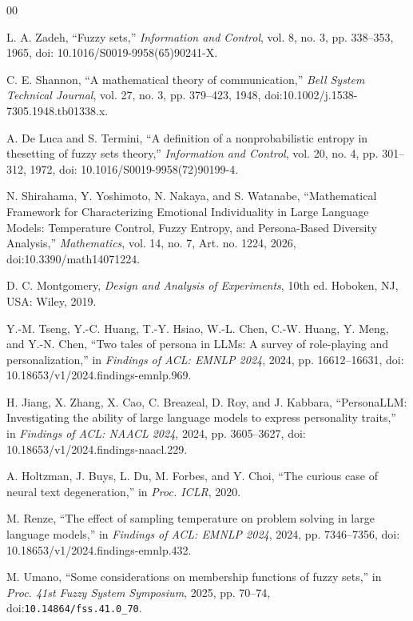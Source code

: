 \documentclass[conference]{IEEEtran}
\begin{document}
\begin{thebibliography}{00}

L. A. Zadeh, ``Fuzzy sets,'' \emph{Information and Control}, vol. 8, no. 3, pp. 338--353, 1965, doi: 10.1016/S0019-9958(65)90241-X.

C. E. Shannon, ``A mathematical theory of communication,'' \emph{Bell System Technical Journal}, vol. 27, no. 3, pp. 379--423, 1948, doi:10.1002/j.1538-7305.1948.tb01338.x.

A. De Luca and S. Termini, ``A definition of a nonprobabilistic entropy in thesetting of fuzzy sets theory,'' \emph{Information and Control}, vol. 20, no. 4, pp. 301--312, 1972, doi: 10.1016/S0019-9958(72)90199-4.

N. Shirahama, Y. Yoshimoto, N. Nakaya, and S. Watanabe, ``Mathematical Framework for Characterizing Emotional Individuality in Large Language Models: Temperature Control, Fuzzy Entropy, and Persona-Based Diversity Analysis,'' \emph{Mathematics}, vol. 14, no. 7, Art. no. 1224, 2026, doi:10.3390/math14071224.

D. C. Montgomery, \emph{Design and Analysis of Experiments}, 10th ed. Hoboken, NJ, USA: Wiley, 2019.

Y.-M. Tseng, Y.-C. Huang, T.-Y. Hsiao, W.-L. Chen, C.-W. Huang, Y. Meng, and Y.-N. Chen, ``Two tales of persona in LLMs: A survey of role-playing and personalization,'' in \emph{Findings of ACL: EMNLP 2024}, 2024, pp. 16612--16631, doi: 10.18653/v1/2024.findings-emnlp.969.

H. Jiang, X. Zhang, X. Cao, C. Breazeal, D. Roy, and J. Kabbara, ``PersonaLLM: Investigating the ability of large language models to express personality traits,'' in \emph{Findings of ACL: NAACL 2024}, 2024, pp. 3605--3627, doi: 10.18653/v1/2024.findings-naacl.229.

A. Holtzman, J. Buys, L. Du, M. Forbes, and Y. Choi, ``The curious case of neural text degeneration,'' in \emph{Proc. ICLR}, 2020.

M. Renze, ``The effect of sampling temperature on problem solving in large language models,'' in \emph{Findings of ACL: EMNLP 2024}, 2024, pp. 7346--7356, doi: 10.18653/v1/2024.findings-emnlp.432.

M. Umano, ``Some considerations on membership functions of fuzzy sets,'' in \emph{Proc. 41st Fuzzy System Symposium}, 2025, pp. 70--74, doi:\texttt{10.14864/fss.41.0\_70}.


\end{thebibliography}
\end{document}
